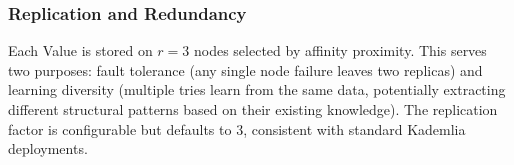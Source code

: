 \subsubsection{Replication and Redundancy}

Each Value is stored on $r = 3$ nodes selected by affinity proximity.
This serves two purposes: fault tolerance (any single node failure
leaves two replicas) and learning diversity (multiple tries learn from
the same data, potentially extracting different structural patterns
based on their existing knowledge).  The replication factor is
configurable but defaults to 3, consistent with standard Kademlia
deployments.
